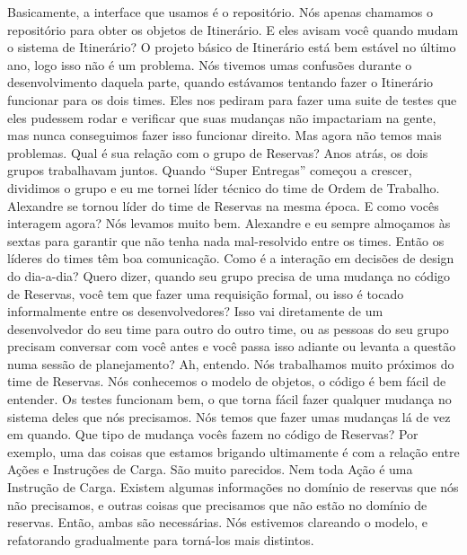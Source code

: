 \documentclass[12pt,play]{article}
\begin{document}
\lean Basicamente, a interface que usamos é o repositório. Nós apenas chamamos o repositório para obter os objetos de Itinerário.
\serg E eles avisam você quando mudam o sistema de Itinerário?
\lean O projeto básico de Itinerário está bem estável no último ano, logo isso não é um problema. Nós tivemos umas confusões durante o desenvolvimento daquela parte, quando estávamos tentando fazer o Itinerário funcionar para os dois times. Eles nos pediram para fazer uma suite de testes que eles pudessem rodar e verificar que suas mudanças não impactariam na gente, mas nunca conseguimos fazer isso funcionar direito. Mas agora não temos mais problemas.
\serg Qual é sua relação com o grupo de Reservas?
\lean Anos atrás, os dois grupos trabalhavam juntos. Quando ``Super Entregas'' começou a crescer, dividimos o grupo e eu me tornei líder técnico do time de Ordem de Trabalho. Alexandre se tornou líder do time de Reservas na mesma época.
\serg E como vocês interagem agora?
\lean Nós levamos muito bem. Alexandre e eu sempre almoçamos às sextas para garantir que não tenha nada mal-resolvido entre os times.
\serg Então os líderes do times têm boa comunicação. Como é a interação em decisões de design do dia-a-dia? Quero dizer, quando seu grupo precisa de uma mudança no código de Reservas, você tem que fazer uma requisição formal, ou isso é tocado informalmente entre os desenvolvedores? Isso vai diretamente de um desenvolvedor do seu time para outro do outro time, ou as pessoas do seu grupo precisam conversar com você antes e você passa isso adiante ou levanta a questão numa sessão de planejamento? 
\lean Ah, entendo. Nós trabalhamos muito próximos do time de Reservas. Nós conhecemos o modelo de objetos, o código é bem fácil de entender. Os testes funcionam bem, o que torna fácil fazer qualquer mudança no sistema deles que nós precisamos. Nós temos que fazer umas mudanças lá de vez em quando.
\serg Que tipo de mudança vocês fazem no código de Reservas?
\lean Por exemplo, uma das coisas que estamos brigando ultimamente é com a relação entre Ações e Instruções de Carga. São muito parecidos. Nem toda Ação é uma Instrução de Carga. Existem algumas informações no domínio de reservas que nós não precisamos, e outras coisas que precisamos que não estão no domínio de reservas. Então, ambas são necessárias. Nós estivemos clareando o modelo, e refatorando gradualmente para torná-los mais distintos.

\narr {}
\end{document}
